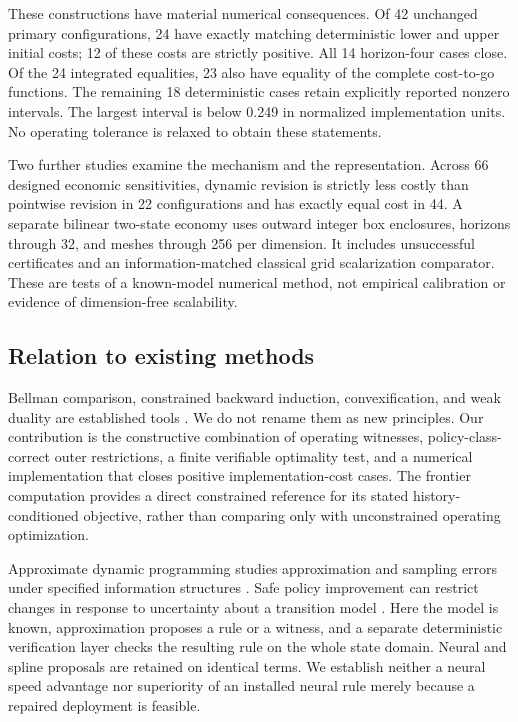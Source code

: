 These constructions have material numerical consequences. Of 42 unchanged primary configurations, 24 have exactly matching deterministic lower and upper initial costs; 12 of these costs are strictly positive. All 14 horizon-four cases close. Of the 24 integrated equalities, 23 also have equality of the complete cost-to-go functions. The remaining 18 deterministic cases retain explicitly reported nonzero intervals. The largest interval is below 0.249 in normalized implementation units. No operating tolerance is relaxed to obtain these statements.

Two further studies examine the mechanism and the representation. Across 66 designed economic sensitivities, dynamic revision is strictly less costly than pointwise revision in 22 configurations and has exactly equal cost in 44. A separate bilinear two-state economy uses outward integer box enclosures, horizons through 32, and meshes through 256 per dimension. It includes unsuccessful certificates and an information-matched classical grid scalarization comparator. These are tests of a known-model numerical method, not empirical calibration or evidence of dimension-free scalability.

\subsection{Relation to existing methods}
Bellman comparison, constrained backward induction, convexification, and weak duality are established tools \citep{Altman1999,Judd1998}. We do not rename them as new principles. Our contribution is the constructive combination of operating witnesses, policy-class-correct outer restrictions, a finite verifiable optimality test, and a numerical implementation that closes positive implementation-cost cases. The frontier computation provides a direct constrained reference for its stated history-conditioned objective, rather than comparing only with unconstrained operating optimization.

Approximate dynamic programming studies approximation and sampling errors under specified information structures \citep{MunosSzepesvari2008,Scherrer2013}. Safe policy improvement can restrict changes in response to uncertainty about a transition model \citep{Laroche2019}. Here the model is known, approximation proposes a rule or a witness, and a separate deterministic verification layer checks the resulting rule on the whole state domain. Neural and spline proposals are retained on identical terms. We establish neither a neural speed advantage nor superiority of an installed neural rule merely because a repaired deployment is feasible.


